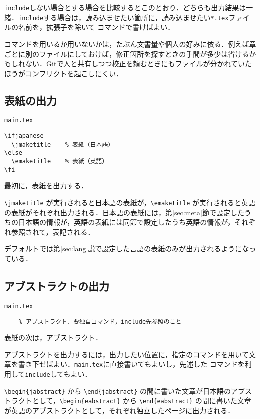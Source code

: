\texttt{include}しない場合とする場合を比較するとこのとおり．どちらも出力結果は一緒．\texttt{include}する場合は，読み込ませたい箇所に，読み込ませたい\texttt{*.tex}ファイルの名前を，拡張子を除いて \verb|| コマンドで書けばよい．

\verb|| コマンドを用いるか用いないかは，たぶん文書量や個人の好みに依る．例えば章ごとに別のファイルにしておけば，修正箇所を探すときの手間が多少は省けるかもしれない．Gitで人と共有しつつ校正を頼むときにもファイルが分かれていたほうがコンフリクトを起こしにくい．


\subsection{表紙の出力}

\begin{itembox}[l]{\texttt{main.tex}}
\begin{verbatim}
\ifjapanese
  \jmaketitle    % 表紙（日本語）
\else
  \emaketitle    % 表紙（英語）
\fi
\end{verbatim}
\end{itembox}

最初に，表紙を出力する．

\verb|\jmaketitle| が実行されると日本語の表紙が，\verb|\emaketitle| が実行されると英語の表紙がそれぞれ出力される．日本語の表紙には，第\ref{sec:meta}節で設定したうちの日本語の情報が，英語の表紙には同節で設定したうち英語の情報が，それぞれ参照されて，表記される．

デフォルトでは第\ref{sec:lang}説で設定した言語の表紙のみが出力されるようになっている．

\subsection{アブストラクトの出力}

\begin{itembox}[l]{\texttt{main.tex}}
\begin{verbatim}
	% アブストラクト．要独自コマンド，include先参照のこと
\end{verbatim}
\end{itembox}

表紙の次は，アブストラクト．

アブストラクトを出力するには，出力したい位置に，指定のコマンドを用いて文章を書き下せばよい．\texttt{main.tex}に直接書いてもよいし，先述した \verb|| コマンドを利用して\texttt{include}してもよい．

\verb|\begin{jabstract}| から \verb|\end{jabstract}| の間に書いた文章が日本語のアブストラクトとして，\verb|\begin{eabstract}| から \verb|\end{eabstract}| の間に書いた文章が英語のアブストラクトとして，それぞれ独立したページに出力される．

